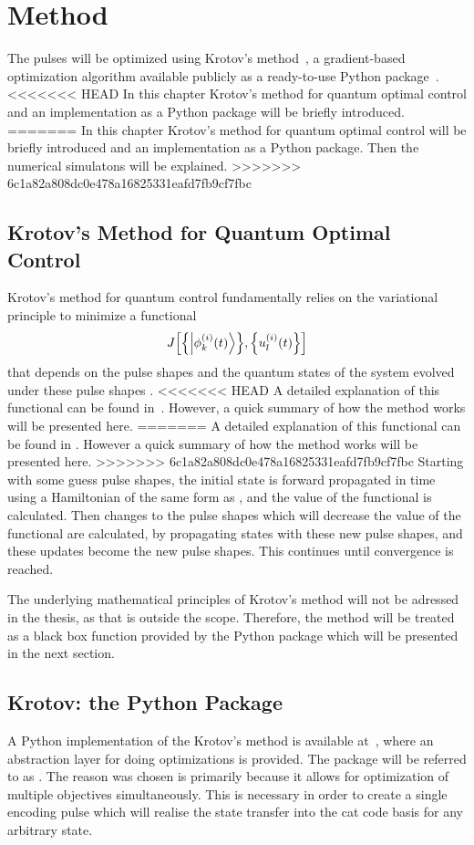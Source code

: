 \documentclass[main.tex]{subfiles}
\begin{document}
\chapter{Method}
The pulses will be optimized using Krotov's method~\cite{reich_monotonically_2012}, a gradient-based optimization algorithm available publicly as a ready-to-use Python package~\cite{goerz_krotov:_2019}.
<<<<<<< HEAD
In this chapter Krotov's method for quantum optimal control and an implementation as a Python package will be briefly introduced.
=======
In this chapter Krotov's method for quantum optimal control will be briefly introduced and an implementation as a Python package.
Then the numerical simulatons will be explained.
>>>>>>> 6c1a82a808dc0e478a16825331eafd7fb9cf7fbc

\section{Krotov's Method for Quantum Optimal Control}
Krotov's method for quantum control fundamentally relies on the variational principle to minimize a functional
\[ J\qty[\qty{\ket{\phi^{(i)}_k(t)}},\qty{u_l^{(i)}(t)}] \]
that depends on the pulse shapes and the quantum states of the system evolved under these pulse shapes \cite{goerz_krotov:_2019}.
<<<<<<< HEAD
A detailed explanation of this functional can be found in~\cite{reich_monotonically_2012}.
However, a quick summary of how the method works will be presented here.
=======
A detailed explanation of this functional can be found in \cite{reich_monotonically_2012}.
However a quick summary of how the method works will be presented here.
>>>>>>> 6c1a82a808dc0e478a16825331eafd7fb9cf7fbc
Starting with some guess pulse shapes, the initial state is forward propagated in time using a Hamiltonian of the same form as , and the value of the functional is calculated.
Then changes to the pulse shapes which will decrease the value of the functional are calculated, by propagating states with these new pulse shapes, and these updates become the new pulse shapes.
This continues until convergence is reached.

The underlying mathematical principles of Krotov's method will not be adressed in the thesis, as that is outside the scope.
Therefore, the method will be treated as a black box function provided by the Python package which will be presented in the next section.

\section{Krotov: the Python Package}
A Python implementation of the Krotov's method is available at~\cite{goerz_krotov:_2019}, where an abstraction layer for doing optimizations is provided.
The package will be referred to as \krotov{}.
The reason \krotov{} was chosen is primarily because it allows for optimization of multiple objectives simultaneously.
This is necessary in order to create a single encoding pulse which will realise the state transfer into the cat code basis for any arbitrary state.
\end{document}
